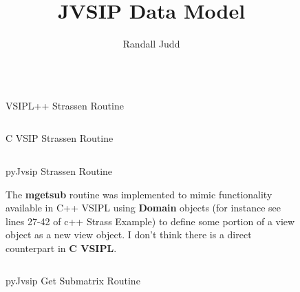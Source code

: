 \documentclass[11pt, oneside]{article}
\title{JVSIP Data Model}
\author{Randall Judd}
\newcommand{\cvl}{\ttbf{C VSIPL}}
\newcommand{\ttbf}[1]{{\ttfamily \bfseries #1}}
\begin{document}
\maketitle


\begin{figure}[t]
\caption{VSIPL++ Strassen Routine}
\inputminted[linenos=true,resetmargins=true,xleftmargin=.50cm,fontfamily=tt, fontsize= \small]{cpp}{./codeEx/strassFunc.cpp}
\end{figure}
%
\begin{figure}[t]
\caption{C VSIP Strassen Routine}
\inputminted[linenos=true,resetmargins=true,xleftmargin=.50cm,fontfamily=tt, fontsize= \small]{c}{./codeEx/strassFunc.c}
\end{figure}
%
\begin{figure}[t]
\caption{pyJvsip Strassen Routine}
\inputminted[linenos=true,resetmargins=true,xleftmargin=.50cm,fontfamily=tt, fontsize= \small]{python}{./codeEx/strassFunc.py}
\end{figure}
%
\begin{figure}[t]
\caption{pyJvsip Get Submatrix Routine}
{The \ttbf{mgetsub} routine was implemented to mimic functionality available in C++ VSIPL using \ttbf{Domain} objects (for instance see lines 27-42 of c++ Strass Example)  to define some portion of a view object as a new view object. I don't think there is a direct counterpart in \cvl{}.}
\inputminted[linenos=true,resetmargins=true,xleftmargin=.50cm,fontfamily=tt, fontsize= \small]{python}{./codeEx/mgetsub.py}
\end{figure}
\end{document}
